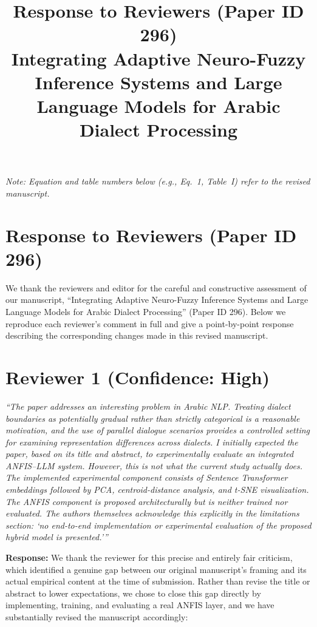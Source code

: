 \documentclass[11pt]{article}
\title{Response to Reviewers (Paper ID 296)\\
\large Integrating Adaptive Neuro-Fuzzy Inference Systems and Large Language Models for Arabic Dialect Processing}
\author{}
\date{}
\begin{document}
\maketitle
\vspace{-1.5em}

\noindent\emph{Note: Equation and table numbers below (e.g., Eq.~1, Table~I) refer to the revised manuscript.}

\section*{Response to Reviewers (Paper ID 296)}
We thank the reviewers and editor for the careful and constructive assessment of our manuscript, ``Integrating Adaptive Neuro-Fuzzy Inference Systems and Large Language Models for Arabic Dialect Processing'' (Paper ID 296). Below we reproduce each reviewer's comment in full and give a point-by-point response describing the corresponding changes made in this revised manuscript.

\section*{Reviewer 1 (Confidence: High)}
\textit{``The paper addresses an interesting problem in Arabic NLP. Treating dialect boundaries as potentially gradual rather than strictly categorical is a reasonable motivation, and the use of parallel dialogue scenarios provides a controlled setting for examining representation differences across dialects. I initially expected the paper, based on its title and abstract, to experimentally evaluate an integrated ANFIS--LLM system. However, this is not what the current study actually does. The implemented experimental component consists of Sentence Transformer embeddings followed by PCA, centroid-distance analysis, and t-SNE visualization. The ANFIS component is proposed architecturally but is neither trained nor evaluated. The authors themselves acknowledge this explicitly in the limitations section: `no end-to-end implementation or experimental evaluation of the proposed hybrid model is presented.'''}

\textbf{Response:} We thank the reviewer for this precise and entirely fair criticism, which identified a genuine gap between our original manuscript's framing and its actual empirical content at the time of submission. Rather than revise the title or abstract to lower expectations, we chose to close this gap directly by implementing, training, and evaluating a real ANFIS layer, and we have substantially revised the manuscript accordingly:
\end{document}
